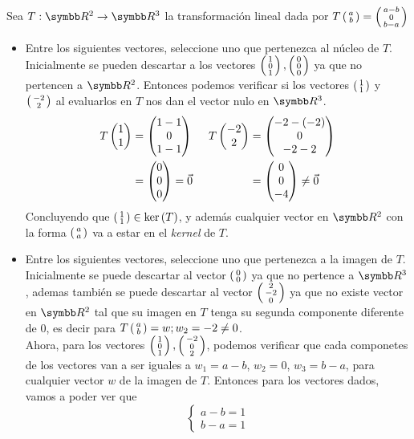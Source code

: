 \item Sea \(T: \realR^2 \rightarrow \realR^3\) la transformación lineal dada por \(T \fsmvec{a,b}=\fsmvec{a-b,0,b-a}\)
    \begin{itemize}
        \item Entre los siguientes vectores, seleccione uno que pertenezca al núcleo de \(T\). \\
            Inicialmente se pueden descartar a los vectores \(\fsmvec{1,0,1}, \fsmvec{0,0,0}\) ya que no pertencen a \(\realR^2\). 
            Entonces podemos verificar si los vectores \(\fsmvec{1,1}\) y \(\fsmvec{-2,2}\) al evaluarlos en \(T\) nos dan el vector nulo en \(\realR^3\).
            \[
                \begin{aligned}
                    T\fvec{1,1} &= \fvec{1-1,0,1-1} \\
                    &= \fvec{0,0,0} = \vec{0}
                \end{aligned}
                \hspace{0.5cm}
                \begin{aligned}
                    T\fvec{-2,2} &= \fvec{-2 - (-2),0, -2 - 2} \\
                    &= \fvec{0,0,-4} \neq \vec{0}
                \end{aligned}
            \]
            Concluyendo que \(\fsmvec{1,1} \in \fker{T}\), y además cualquier vector en \(\realR^2\) con la forma \(\fsmvec{a,a}\) va a estar en el \emph{kernel} de \(T\).
        \item Entre los siguientes vectores, seleccione uno que pertenezca a la imagen de \(T\). \\
            Inicialmente se puede descartar al vector \(\fsmvec{0,0}\) ya que no pertence a \(\realR^3\), 
            ademas también se puede descartar al vector \(\fsmvec{2,-2,0}\) ya que no existe vector en \(\realR^2\) tal que su imagen en \(T\) tenga 
            su segunda componente diferente de 0, es decir para \(T\fsmvec{a,b} = w; w_2 = -2 \neq 0\). \\
            Ahora, para los vectores \(\fsmvec{1,0,1}, \fsmvec{-2,0,2}\), podemos verificar que cada componetes de los vectores van a ser iguales a 
            \(w_1 = a - b\), \(w_2 = 0\), \(w_3 = b - a\), para cualquier vector \(w\) de la imagen de \(T\). Entonces para los vectores dados, vamos a poder ver que
            \[
                \begin{cases}
                    a - b = 1 \\
                    b - a = 1

\end{cases}\]
\end{itemize}
